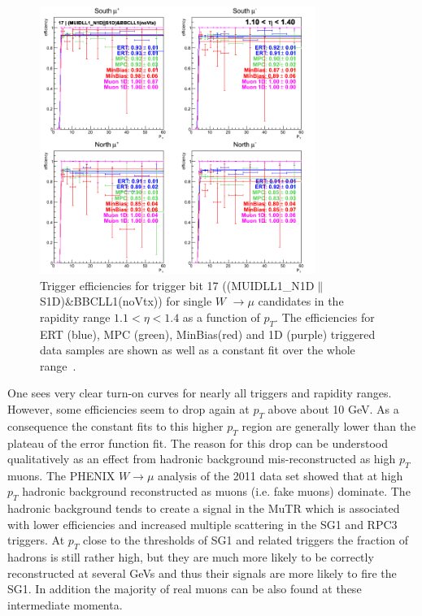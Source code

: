 \begin{figure}[ht]
  \centering
  \includegraphics[width=0.8\textwidth]{./figures/run13_trigeffipt_eta0_trig17_lin.png}
  \caption{
    Trigger efficiencies for trigger bit 17
    ((MUIDLL1\_N1D$\|$S1D)\&BBCLL1(noVtx)) for single $W$ $\rightarrow \mu$
    candidates in the rapidity range $ 1.1 < \eta < 1.4$ as a function of
    $p_T$. The efficiencies for ERT (blue), MPC (green),
    MinBias(red) and 1D (purple) triggered data samples are shown as well as a
    constant fit over the whole range~\cite{Seidl2014}.
  }
  \label{fig:run13_trigeffipt_eta0_nper0_trig17_lin} 
\end{figure}

One sees very clear turn-on curves for nearly all triggers and rapidity ranges.
However, some efficiencies seem to drop again at $p_T$ above about 10 GeV. As a
consequence the constant fits to this higher $p_T$ region are generally lower
than the plateau of the error function fit. The reason for this drop can be
understood qualitatively as an effect from hadronic background mis-reconstructed
as high $p_T$ muons. The PHENIX $W\rightarrow\mu$ analysis of the 2011 data set
\cite{Seidl2012} showed that at high $p_T$ hadronic background reconstructed as
muons (i.e. fake muons) dominate. The hadronic background tends to create a
signal in the MuTR which is associated with lower efficiencies and increased
multiple scattering in the SG1 and RPC3 triggers. At $p_T$ close to the
thresholds of SG1 and related triggers the fraction of hadrons is still rather
high, but they are much more likely to be correctly reconstructed at several
GeVs and thus their signals are more likely to fire the SG1. In addition the
majority of real muons can be also found at these intermediate momenta. 

